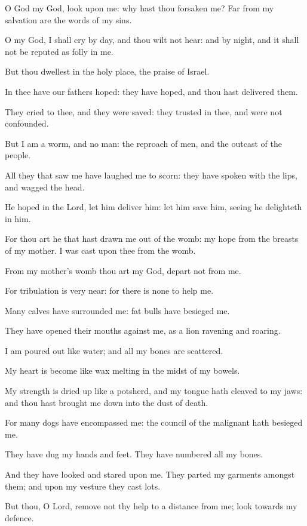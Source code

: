 ﻿\item O God my God, look upon me: why hast thou forsaken me? Far from my salvation are the words of my sins.
\item O my God, I shall cry by day, and thou wilt not hear: and by night, and it shall not be reputed as folly in me.
\item But thou dwellest in the holy place, the praise of Israel. 
\item In thee have our fathers hoped: they have hoped, and thou hast delivered them.
\item They cried to thee, and they were saved: they trusted in thee, and were not confounded.
\item But I am a worm, and no man: the reproach of men, and the outcast of the people.
\item All they that saw me have laughed me to scorn: they have spoken with the lips, and wagged the head.
\item He hoped in the Lord, let him deliver him: let him save him, seeing he delighteth in him.
\item For thou art he that hast drawn me out of the womb: my hope from the breasts of my mother. I was cast upon thee from the womb.
\item From my mother’s womb thou art my God, depart not from me.
\item For tribulation is very near: for there is none to help me.
\item Many calves have surrounded me: fat bulls have besieged me.
\item They have opened their mouths against me, as a lion ravening and roaring.
\item I am poured out like water; and all my bones are scattered.
\item My heart is become like wax melting in the midst of my bowels.
\item My strength is dried up like a potsherd, and my tongue hath cleaved to my jaws: and thou hast brought me down into the dust of death.
\item For many dogs have encompassed me: the council of the malignant hath besieged me.
\item They have dug my hands and feet. They have numbered all my bones.
\item And they have looked and stared upon me. They parted my garments amongst them; and upon my vesture they cast lots.
\item But thou, O Lord, remove not thy help to a distance from me; look towards my defence.
